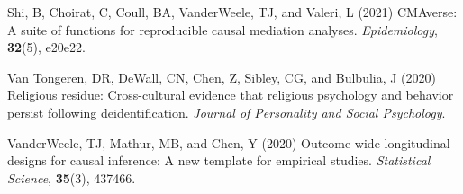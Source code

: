 \documentclass[
  singlecolumn]{article}
\newlength{\cslhangindent}
\newlength{\cslentryspacingunit} %
\newenvironment{CSLReferences}[2] %
 {%
  \setlength{\parindent}{0pt}
  \ifodd #1
  \let\oldpar\par
  \def\par{\hangindent=\cslhangindent\oldpar}
  \fi
  \setlength{\parskip}{#2\cslentryspacingunit}
 }%
 {}
\begin{document}
\begin{CSLReferences}{1}{0}
\leavevmode{}%
Shi, B, Choirat, C, Coull, BA, VanderWeele, TJ, and Valeri, L (2021)
CMAverse: A suite of functions for reproducible causal mediation
analyses. \emph{Epidemiology}, \textbf{32}(5), e20e22.

\leavevmode{}%
Van Tongeren, DR, DeWall, CN, Chen, Z, Sibley, CG, and Bulbulia, J
(2020) Religious residue: Cross-cultural evidence that religious
psychology and behavior persist following deidentification.
\emph{Journal of Personality and Social Psychology}.

\leavevmode{}%
VanderWeele, TJ, Mathur, MB, and Chen, Y (2020) Outcome-wide
longitudinal designs for causal inference: A new template for empirical
studies. \emph{Statistical Science}, \textbf{35}(3), 437466.

\end{CSLReferences}
\end{document}
